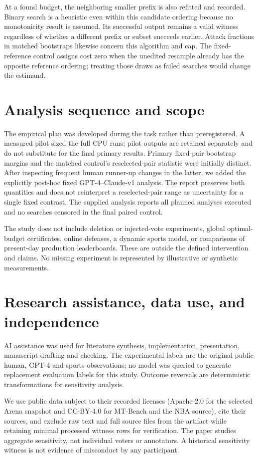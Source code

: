 At a found budget, the neighboring smaller prefix is also refitted and recorded. Binary search is a heuristic even within this candidate ordering because no monotonicity result is assumed. Its successful output remains a valid witness regardless of whether a different prefix or subset succeeds earlier. Attack fractions in matched bootstraps likewise concern this algorithm and cap. The fixed-reference control assigns cost zero when the unedited resample already has the opposite reference ordering; treating those draws as failed searches would change the estimand.

\section{Analysis sequence and scope}
The empirical plan was developed during the task rather than preregistered. A measured pilot sized the full CPU runs; pilot outputs are retained separately and do not substitute for the final primary results. Primary fixed-pair bootstrap margins and the matched control's reselected-pair statistic were initially distinct. After inspecting frequent human runner-up changes in the latter, we added the explicitly post-hoc fixed GPT-4--Claude-v1 analysis. The report preserves both quantities and does not reinterpret a reselected-pair range as uncertainty for a single fixed contrast. The supplied analysis reports all planned analyses executed and no searches censored in the final paired control.

The study does not include deletion or injected-vote experiments, global optimal-budget certificates, online defenses, a dynamic sports model, or comparisons of present-day production leaderboards. These are outside the defined intervention and claims. No missing experiment is represented by illustrative or synthetic measurements.

\section{Research assistance, data use, and independence}
AI assistance was used for literature synthesis, implementation, presentation, manuscript drafting and checking. The experimental labels are the original public human, GPT-4 and sports observations; no model was queried to generate replacement evaluation labels for this study. Outcome reversals are deterministic transformations for sensitivity analysis.

We use public data subject to their recorded licenses (Apache-2.0 for the selected Arena snapshot and CC-BY-4.0 for MT-Bench and the NBA source), cite their sources, and exclude raw text and full source files from the artifact while retaining minimal processed witness rows for verification. The paper studies aggregate sensitivity, not individual voters or annotators. A historical sensitivity witness is not evidence of misconduct by any participant.

